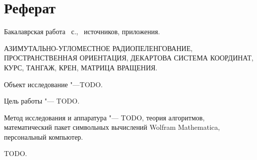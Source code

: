 \documentclass[../main.tex]{subfiles}
\begin{document}
\newpage
\section*{\centering Реферат}

\par\noindent Бакалаврская работа ~с., \ источников,  приложения.\\
\vspace{0.5cm}

\par\noindent АЗИМУТАЛЬНО-УГЛОМЕСТНОЕ РАДИОПЕЛЕНГОВАНИЕ, ПРОСТРАНСТВЕННАЯ ОРИЕНТАЦИЯ, ДЕКАРТОВА СИСТЕМА КООРДИНАТ, КУРС, ТАНГАЖ, КРЕН, МАТРИЦА ВРАЩЕНИЯ.\\

\par\noindent Объект исследование "---TODO.\\
\par\noindent Цель работы "--- TODO.\\
\par\noindent Метод исследования и аппаратура "--- TODO, теория алгоритмов, математический пакет символьных вычислений {\ttfamily Wolfram Mathematica}, персональный компьютер.\\

\par\noindent TODO.

\clearpage
\normalsize
\end{document}
